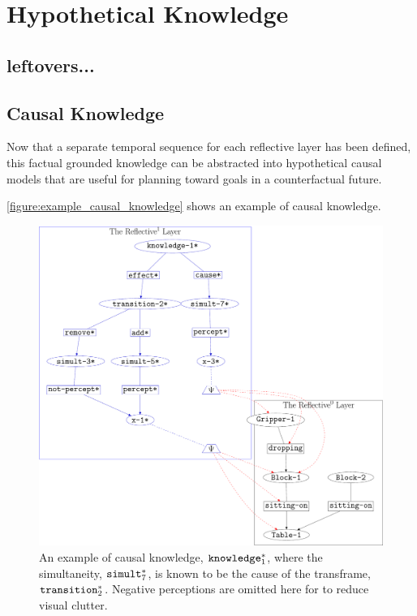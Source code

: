 \chapter{Hypothetical Knowledge}
\label{chapter:hypothetical_knowledge}

\section{leftovers...}

\section{Causal Knowledge}

Now that a separate temporal sequence for each reflective layer has
been defined, this factual grounded knowledge can be abstracted into
hypothetical causal models that are useful for planning toward goals
in a counterfactual future.



{\mbox{\autoref{figure:example_causal_knowledge}}} shows an example of
causal knowledge.
\begin{figure}
\center
\includegraphics[width=12cm]{gfx/example_causal_knowledge}
\caption[An example of a causal knowledge.]{An example of causal
  knowledge, $\text{\tt{knowledge}}_1^*$, where the simultaneity,
  $\text{\tt{simult}}_7^*$, is known to be the cause of the
  transframe, $\text{\tt{transition}}_2^*$.  Negative perceptions are
  omitted here for to reduce visual clutter.}
\label{figure:example_causal_knowledge}
\end{figure}

